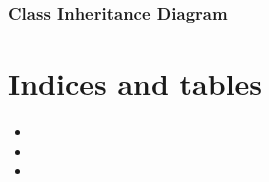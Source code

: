 \documentclass[letterpaper,10pt,english]{sphinxmanual}
\begin{document}
\subsection{Class Inheritance Diagram}
\label{\detokenize{13_preprocessing:class-inheritance-diagram}}


\chapter{Indices and tables}
\label{\detokenize{index:indices-and-tables}}\begin{itemize}
\item {} 

\item {} 

\item {} 

\end{itemize}
\end{document}
